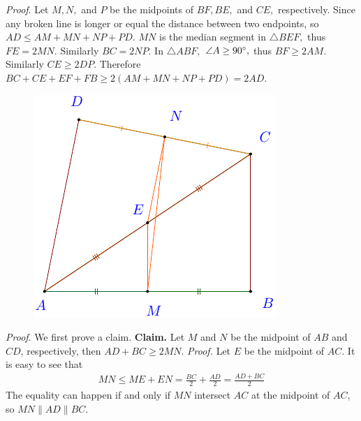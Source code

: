 \begin{multicols}{2}
\begin{figure}[H]
		\vspace*{-10pt}
	\end{figure}
	\textit{Proof}.
	Let $M, N,$ and $P$ be the midpoints of $BF, BE,$ and $CE,$ respectively.
	Since any broken line is longer or equal the distance between two endpoints, so $AD\le AM+MN+NP+PD.$
	$MN$ is the median segment in $\triangle BEF,$ thus $FE = 2MN.$ Similarly $BC=2NP.$
	In $\triangle ABF,$ $\angle A \ge 90^\circ,$ thus $BF \ge 2AM.$ Similarly $CE \ge 2DP.$
	Therefore $BC+CE+EF+FB \ge 2(AM+MN+NP+PD) = 2AD.$
	\vskip 0.2cm
	\begin{figure}[H]
		\vspace*{-5pt}
		\centering
		\captionsetup{labelformat= empty, justification=centering}
		\includegraphics[width= 0.8\linewidth]{romanian-pb-gt-40.pdf}
		\vspace*{-10pt}
	\end{figure}
	\textit{Proof}.
	We first prove a claim.
	\vskip 0.1cm
	\textbf{Claim.} Let $M$ and $N$ be the midpoint of $AB$ and $CD$, respectively, then $AD+ BC \ge 2MN.$
	\vskip 0.1cm
	\textit{Proof.}
	Let $E$ be the midpoint of $AC.$ It is easy to see that 
	\begin{align*}
		MN \le ME+EN = \frac{BC}{2} + \frac{AD}{2} = \frac{AD+BC}{2}
	\end{align*}
	The equality can happen if and only if $MN$ intersect $AC$ at the midpoint of $AC$, so $MN \parallel AD \parallel BC.$

\end{multicols}
